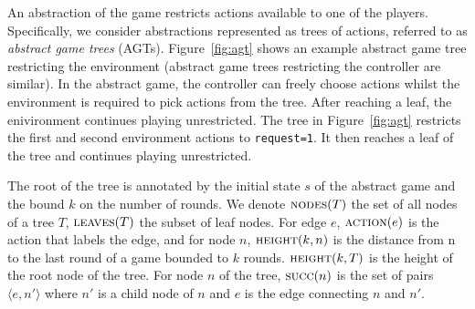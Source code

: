 \documentclass{llncs}
\begin{document}
An abstraction of the game restricts actions available to one of the players.
Specifically, we consider abstractions represented as trees of actions,
referred to as \emph{abstract game trees} (AGTs).  Figure~\ref{fig:agt} shows
an example abstract game tree restricting the environment (abstract game trees
restricting the controller are similar).  In the abstract game, the controller
can freely choose actions whilst the environment is required to pick actions
from the tree.  After reaching a leaf, the enivironment continues playing
unrestricted.  The tree in Figure~\ref{fig:agt} restricts the first and second
environment actions to \texttt{request=1}. It then reaches a leaf of the tree
and continues playing unrestricted. 

The root of the tree is annotated by the initial state $s$ of the abstract game
and the bound $k$ on the number of rounds.  We denote $\textsc{nodes}(T)$ the
set of all nodes of a tree $T$, $\textsc{leaves}(T)$ the subset of leaf nodes.
For edge $e$, $\textsc{action}(e)$ is the action that labels the edge, and for
node $n$, $\textsc{height}(k, n)$ is the distance from n to the last round of a
game bounded to $k$ rounds.  $\textsc{height}(k, T)$ is the height of the root
node of the tree.  For node $n$ of the tree, $\textsc{succ}(n)$ is the set of
pairs $\langle e, n' \rangle$ where $n'$ is a child node of $n$ and $e$ is the
edge connecting $n$ and $n'$.
\end{document}
